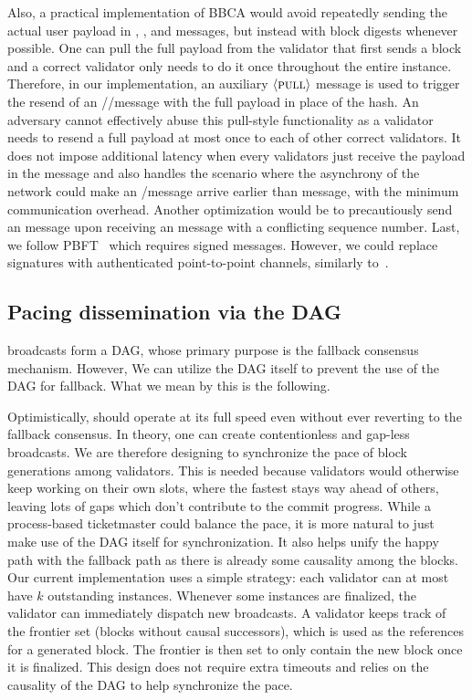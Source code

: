 Also, a practical implementation of BBCA would avoid repeatedly sending the actual user payload in \echo, \ready, and \checkpoint messages, but instead with block digests whenever possible.
One can pull the full payload from the validator that first sends a block and a correct validator only needs to do it once throughout the entire \primitive instance. Therefore, in our implementation,
an auxiliary $\langle\textsc{pull}\rangle$ message is used to trigger the resend of an \echo/\ready/\checkpoint message with the full payload in place of the hash. An adversary cannot effectively abuse this pull-style functionality as
a validator needs to resend a full payload at most once to each of other correct validators. It does not impose additional latency when every validators just receive the payload in the \initiate message and also handles the scenario
where the asynchrony of the network could make an \echo/\ready message arrive earlier than \initiate message, with the minimum communication overhead.  Another optimization would be to precautiously send an \abort message upon receiving an \initiate message with a conflicting sequence number.
Last, we follow PBFT~\cite{PBFT} which requires signed messages. However, we could replace signatures with authenticated point-to-point channels, similarly to~\cite{PBFT:2002}.

\subsection{Pacing dissemination via the DAG}
\primitive broadcasts form a DAG, whose primary purpose is the fallback consensus mechanism. 
However,
We can utilize the DAG itself to prevent the use of the DAG for fallback. What we mean by this is the following.

Optimistically, \system should operate at its full speed
even without ever reverting to the  fallback consensus. In theory, one can create contentionless and gap-less
broadcasts.
We are therefore designing \system to synchronize the pace of 
block generations among validators. This is needed because validators would otherwise
keep working on their own slots, where the fastest stays way ahead of others,
leaving lots of gaps which don't contribute to the commit progress. While a
process-based ticketmaster could balance the pace, it is more natural to just
make use of the DAG itself for synchronization. It also helps unify the happy path with
the fallback path as there is already some causality among the blocks. Our current implementation
uses a simple strategy: each validator can at most have $k$ outstanding \primitive instances.
Whenever some instances are finalized, the validator can immediately dispatch new broadcasts. A validator
keeps track of the frontier set (blocks without causal successors), which is used as the references
for a generated block. The frontier is then set to only contain the new block
once it is finalized. This design does not require extra timeouts and
relies on the causality of the DAG to help synchronize the pace.


